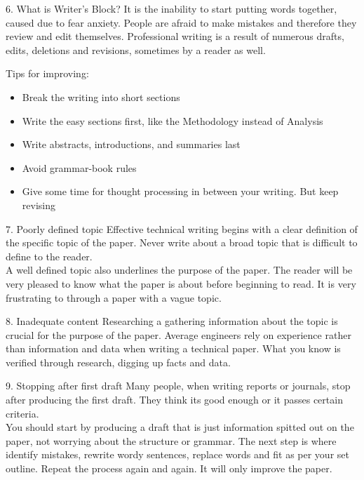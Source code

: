 \documentclass[10pt]{beamer}
\begin{document}
{
	\begin{frame}{6. What is Writer's Block?}
		It is the inability to start putting words together, caused due to fear anxiety. People are afraid to make mistakes and therefore they review and edit themselves. Professional writing is a result of numerous drafts, edits, deletions and revisions, sometimes by a reader as well. 
		\begin{alertblock}{Tips for improving:}
			\begin{itemize}[<+- | alert@+>]
				\item Break the writing into short sections
				\item Write the easy sections first, like the Methodology instead of Analysis
				\item Write abstracts, introductions, and summaries last
				\item Avoid grammar-book rules
				\item Give some time for thought processing in between your writing. But keep revising
			\end{itemize}
		\end{alertblock}
	\end{frame}
}
{
	\begin{frame}{7. Poorly defined topic}
		Effective technical writing begins with a clear definition of the specific topic of the paper. Never write about a broad topic that is difficult to define to the reader. \\
		\vspace{5mm}
		A well defined topic also underlines the purpose of the paper. The reader will be very pleased to know what the paper is about before beginning to read. It is very frustrating to through a paper with a vague topic.  
	\end{frame}
}
{
	\begin{frame}{8. Inadequate content}
		Researching a gathering information about the topic is crucial for the purpose of the paper. Average engineers rely on experience rather than information and data when writing a technical paper. What you know is verified through research, digging up facts and data.		
	\end{frame}
}
{
	\begin{frame}{9. Stopping after first draft}
		Many people, when writing reports or journals, stop after producing the first draft. They think its good enough or it passes certain criteria. \\You should start by producing a draft that is just information spitted out on the paper, not worrying about the structure or grammar. The next step is where identify mistakes, rewrite wordy sentences, replace words and fit as per your set outline. Repeat the process again and again. It will only improve the paper. 	
	\end{frame}
}
\end{document}
